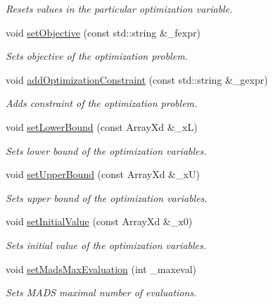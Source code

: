 \begin{DoxyCompactItemize}
\begin{DoxyCompactList}\small\item\em Resets values in the particular optimization variable. \end{DoxyCompactList}\item 
void \hyperlink{class_go_s_u_m_1_1_c_container_a8880693579c129adb040e375bd4647eb}{set\-Objective} (const std\-::string \&\-\_\-fexpr)
\begin{DoxyCompactList}\small\item\em Sets objective of the optimization problem. \end{DoxyCompactList}\item 
void \hyperlink{class_go_s_u_m_1_1_c_container_a1bf466069ef62a5d773f0371c4b63734}{add\-Optimization\-Constraint} (const std\-::string \&\-\_\-gexpr)
\begin{DoxyCompactList}\small\item\em Adds constraint of the optimization problem. \end{DoxyCompactList}\item 
void \hyperlink{class_go_s_u_m_1_1_c_container_a2757000e2f4510f6bf25d4599521585b}{set\-Lower\-Bound} (const Array\-Xd \&\-\_\-x\-L)
\begin{DoxyCompactList}\small\item\em Sets lower bound of the optimization variables. \end{DoxyCompactList}\item 
void \hyperlink{class_go_s_u_m_1_1_c_container_afa0bc2b75c81b6c590e0212180c273b3}{set\-Upper\-Bound} (const Array\-Xd \&\-\_\-x\-U)
\begin{DoxyCompactList}\small\item\em Sets upper bound of the optimization variables. \end{DoxyCompactList}\item 
void \hyperlink{class_go_s_u_m_1_1_c_container_abb53ea6876c4369ac26d6cb3e21fc1c2}{set\-Initial\-Value} (const Array\-Xd \&\-\_\-x0)
\begin{DoxyCompactList}\small\item\em Sets initial value of the optimization variables. \end{DoxyCompactList}\item 
void \hyperlink{class_go_s_u_m_1_1_c_container_ab63c8de284df2a92d36a1dff63f7aa9a}{set\-Mads\-Max\-Evaluation} (int \-\_\-maxeval)
\begin{DoxyCompactList}\small\item\em Sets M\-A\-D\-S maximal number of evaluations. \end{DoxyCompactList}\item 

\end{DoxyCompactItemize}
